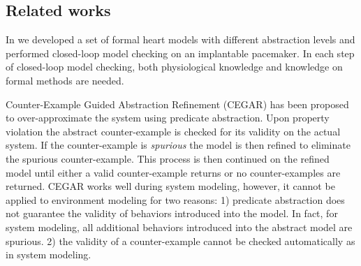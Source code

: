 \subsection{Related works}
In \cite{sttt13} we developed a set of formal heart models with different abstraction levels and performed closed-loop model checking on an implantable pacemaker. 
In each step of closed-loop model checking, both physiological knowledge and knowledge on formal methods are needed.

Counter-Example Guided Abstraction Refinement (CEGAR) \cite{CEGAR} has been proposed to over-approximate the system using predicate abstraction. Upon property violation the abstract counter-example is checked for its validity on the actual system. If the counter-example is \emph{spurious} the model is then refined to eliminate the spurious counter-example. This process is then continued on the refined model until either a valid counter-example returns or no counter-examples are returned. CEGAR works well during system modeling, however, it cannot be applied to environment modeling for two reasons: 1) predicate abstraction does not guarantee the validity of behaviors introduced into the model. In fact, for system modeling, all additional behaviors introduced into the abstract model are spurious. 2) the validity of a counter-example cannot be checked automatically as in system modeling. 